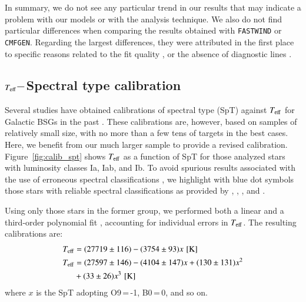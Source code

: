 \documentclass{aa}
\newcommand{\Teff}{\mbox{$T_{\rm eff}$}\xspace}
\begin{document}
In summary, we do not see any particular trend in our results that may indicate a problem with our models or with the analysis technique. We also do not find particular differences when comparing the results obtained with {\tt FASTWIND} or {\tt CMFGEN}. Regarding the largest differences, they were attributed in the first place to specific reasons related to the fit quality \citep[e.g.][]{searle08}, or the absence of diagnostic lines \citep[e.g.][]{lefever07}.




\subsection{\texorpdfstring{\Teff--\,Spectral type calibration}{Teff -- spectral type calibration}}
\label{subsection:43_tmp}

Several studies have obtained calibrations of spectral type (SpT) against \Teff for Galactic BSGs in the past \citep[see][]{lefever07, markova08, searle08, haucke18}. These calibrations are, however, based on samples of relatively small size, with no more than a few tens of targets in the best cases. Here, we benefit from our much larger sample to provide a revised calibration.
Figure~\ref{fig:calib_spt} shows \Teff as a function of SpT for those analyzed stars with luminosity classes Ia, Iab, and Ib. To avoid spurious results associated with the use of erroneous spectral classifications \citep[as those provided by \textit{Simbad} in many cases, see][and Sect.~\ref{subsection:51_tmp}]{deburgos23}, we highlight with blue dot symbols those stars with reliable spectral classifications as provided by \citet{sota11}, \citet{sota14}, \citet{deburgos20, deburgos23}, and \citet{negueruela-subm}.

Using only those stars in the former group, we performed both a linear and a third-order polynomial fit \citep[the later option first proposed by][]{lefever07}, accounting for individual errors in \Teff.
The resulting calibrations are:
%
\begin{align*}
\Teff &= (27719 \pm 116) - (3754 \pm 93) x\,\,[\rm K]\\
\Teff &= (27597\pm146) - (4104\pm147)x + (130\pm131)x^2\\
      & + (33\pm26)x^3\,\,[\rm K]
\end{align*}
%
where $x$ is the SpT adopting O9\,=\,-1, B0\,=\,0, and so on. 
\end{document}
